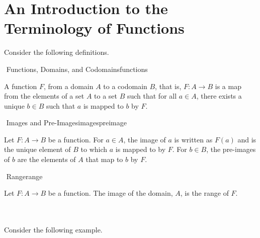 \section{An Introduction to the Terminology of Functions}

    Consider the following definitions.
    \begin{definition}{\Stop\,\,Functions, Domains, and Codomains}{functions}

        A function \(F\), from a domain \(A\) to a codomain \(B\), that is, \(F:A\to B\) is a map from the elements of a set \(A\) to a set \(B\) such that for all \(a\in A\), there exists a unique \(b\in B\) such that \(a\) is mapped to \(b\) by \(F\).

    \end{definition}
    \begin{definition}{\Stop\,\,Images and Pre-Images}{imagespreimage}

        Let \(F:A\to B\) be a function. For \(a\in A\), the image of \(a\) is written as \(F(a)\) and is the unique element of \(B\) to which \(a\) is mapped to by \(F\). For \(b\in B\), the pre-images of \(b\) are the elements of \(A\) that map to \(b\) by \(F\).

    \end{definition}
    \begin{definition}{\Stop\,\,Range}{range}

        Let \(F:A\to B\) be a function. The image of the domain, \(A\), is the range of \(F\).
        
    \end{definition}
    \pagebreak
    \vphantom
    \\
    \\
    Consider the following example.
